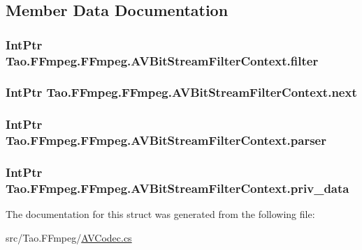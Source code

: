 \subsection{Member Data Documentation}
\hypertarget{struct_tao_1_1_f_fmpeg_1_1_f_fmpeg_1_1_a_v_bit_stream_filter_context_aa8e64cdb98d5e5aa1b2c1f8182a14222}{
\subsubsection[{filter}]{\setlength{\rightskip}{0pt plus 5cm}IntPtr {\bf Tao.FFmpeg.FFmpeg.AVBitStreamFilterContext.filter}}}
\label{struct_tao_1_1_f_fmpeg_1_1_f_fmpeg_1_1_a_v_bit_stream_filter_context_aa8e64cdb98d5e5aa1b2c1f8182a14222}
\hypertarget{struct_tao_1_1_f_fmpeg_1_1_f_fmpeg_1_1_a_v_bit_stream_filter_context_aab4764ec673799ebd6eac3c652a344dc}{
\subsubsection[{next}]{\setlength{\rightskip}{0pt plus 5cm}IntPtr {\bf Tao.FFmpeg.FFmpeg.AVBitStreamFilterContext.next}}}
\label{struct_tao_1_1_f_fmpeg_1_1_f_fmpeg_1_1_a_v_bit_stream_filter_context_aab4764ec673799ebd6eac3c652a344dc}
\hypertarget{struct_tao_1_1_f_fmpeg_1_1_f_fmpeg_1_1_a_v_bit_stream_filter_context_abe7eeae8e8f2c0521e9d8809287ce674}{
\subsubsection[{parser}]{\setlength{\rightskip}{0pt plus 5cm}IntPtr {\bf Tao.FFmpeg.FFmpeg.AVBitStreamFilterContext.parser}}}
\label{struct_tao_1_1_f_fmpeg_1_1_f_fmpeg_1_1_a_v_bit_stream_filter_context_abe7eeae8e8f2c0521e9d8809287ce674}
\hypertarget{struct_tao_1_1_f_fmpeg_1_1_f_fmpeg_1_1_a_v_bit_stream_filter_context_aba2f9f27cc74572e96db9b7db574140d}{
\subsubsection[{priv\_\-data}]{\setlength{\rightskip}{0pt plus 5cm}IntPtr {\bf Tao.FFmpeg.FFmpeg.AVBitStreamFilterContext.priv\_\-data}}}
\label{struct_tao_1_1_f_fmpeg_1_1_f_fmpeg_1_1_a_v_bit_stream_filter_context_aba2f9f27cc74572e96db9b7db574140d}


The documentation for this struct was generated from the following file:\begin{DoxyCompactItemize}
\item 
src/Tao.FFmpeg/\hyperlink{_a_v_codec_8cs}{AVCodec.cs}\end{DoxyCompactItemize}
